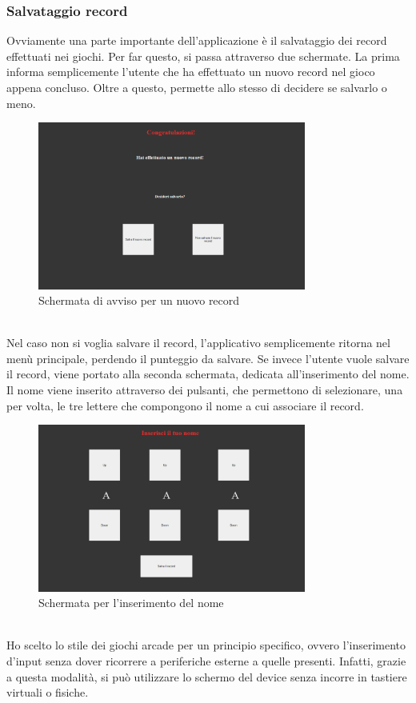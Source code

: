 \subsubsection{Salvataggio record}
Ovviamente una parte importante dell'applicazione è il salvataggio dei record effettuati nei giochi. Per far questo, si passa attraverso due schermate.
La prima informa semplicemente l'utente che ha effettuato un nuovo record nel gioco appena concluso. Oltre a questo, permette allo stesso di decidere se salvarlo o meno.
\begin{figure}[h]
    \centering
    \includegraphics[width=250pt]{images/product/schermataNuovoRecord.png}
    \caption{Schermata di avviso per un nuovo record}
    \label{fig:schermataNuovoRecord}
\end{figure}
\\Nel caso non si voglia salvare il record, l'applicativo semplicemente ritorna nel menù principale, perdendo il punteggio da salvare.
Se invece l'utente vuole salvare il record, viene portato alla seconda schermata, dedicata all'inserimento del nome.\\
Il nome viene inserito attraverso dei pulsanti, che permettono di selezionare, una per volta, le tre lettere che compongono il nome a cui associare il record.
\begin{figure}[h]
    \centering
    \includegraphics[width=250pt]{images/product/schermataInserimentoNome.png}
    \caption{Schermata per l'inserimento del nome}
    \label{fig:schermataInserimentoNome}
\end{figure}
\\Ho scelto lo stile dei giochi arcade per un principio specifico, ovvero l'inserimento d'input senza dover ricorrere a periferiche esterne a quelle presenti. Infatti, grazie a questa modalità, si può utilizzare lo schermo del device senza incorre in tastiere virtuali o fisiche.

